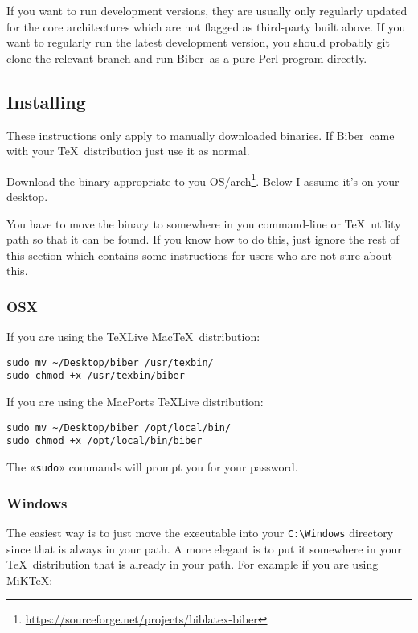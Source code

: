 \documentclass{ltxdockit}
\newcommand*{\biber}{Biber\xspace}
\begin{document}
\noindent If you want to run development versions, they are usually only
regularly updated for the core architectures which are not flagged as
third-party built above. If you want to regularly run the latest
development version, you should probably git clone the relevant branch and
run \biber\ as a pure Perl program directly.

\subsection{Installing}

These instructions only apply to manually downloaded binaries. If
\biber\ came with your \TeX\ distribution just use it as normal.

Download the binary appropriate to you
OS/arch\footnote{\url{https://sourceforge.net/projects/biblatex-biber}}. Below
I assume it's on your desktop.

You have to move the binary to somewhere in you command-line or \TeX\ utility
path so that it can be found. If you know how to do this, just ignore the
rest of this section which contains some instructions for users who are
not sure about this.

\subsubsection{OSX}

If you are using the \TeX Live Mac\TeX\ distribution:

\begin{verbatim}
sudo mv ~/Desktop/biber /usr/texbin/
sudo chmod +x /usr/texbin/biber
\end{verbatim}

\noindent If you are using the MacPorts \TeX Live distribution:

\begin{verbatim}
sudo mv ~/Desktop/biber /opt/local/bin/
sudo chmod +x /opt/local/bin/biber
\end{verbatim}

\noindent The «\verb+sudo+» commands will prompt you for your password.

\subsubsection{Windows}

The easiest way is to just move the executable into your \verb+C:\Windows+ directory since
that is always in your path. A more elegant is to put it somewhere in
your \TeX\ distribution that is already in your path. For example if you
are using MiK\TeX:
\end{document}
